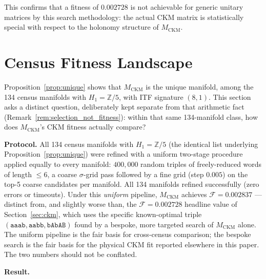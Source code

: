 \documentclass[11pt,a4paper]{article}
\theoremstyle{remark}
\newcommand{\MCKM}{M_{\mathrm{CKM}}}
\newcommand{\Zfive}{\mathbb{Z}/5}
\begin{document}
This confirms that a fitness of $0.002728$ is not
achievable for generic unitary matrices by this search methodology:
the actual CKM matrix is statistically special with respect to the
holonomy structure of $\MCKM$.

\section{Census Fitness Landscape}
\label{sec:census}

Proposition~\ref{prop:unique} shows that $\MCKM$ is the unique manifold,
among the 134 census manifolds with $H_1 = \Zfive$, with ITF signature
$(8,1)$. This section asks a distinct question, deliberately kept separate
from that arithmetic fact (Remark~\ref{rem:selection_not_fitness}): within
that same 134-manifold class, how does $\MCKM$'s CKM fitness actually
compare?

\textbf{Protocol.}
All 134 census manifolds with $H_1 = \Zfive$ (the identical list underlying
Proposition~\ref{prop:unique}) were refined with a uniform two-stage
procedure applied equally to every manifold: $400{,}000$ random triples of
freely-reduced words of length $\leq 6$, a coarse $\sigma$-grid pass
followed by a fine grid (step $0.005$) on the top-5 coarse candidates per
manifold. All 134 manifolds refined successfully (zero errors or timeouts).
Under this \emph{uniform} pipeline, $\MCKM$ achieves $\mathcal{F} = 0.002837$
--- distinct from, and slightly worse than, the $\mathcal{F} = 0.002728$
headline value of Section~\ref{sec:ckm}, which uses the specific
known-optimal triple $(\mathtt{aaab},\mathtt{aabb},\mathtt{bAbAB})$ found by
a bespoke, more targeted search of $\MCKM$ alone.
The uniform pipeline is the fair basis for cross-census comparison; the
bespoke search is the fair basis for the physical CKM fit reported
elsewhere in this paper. The two numbers should not be conflated.

\textbf{Result.}
\end{document}
